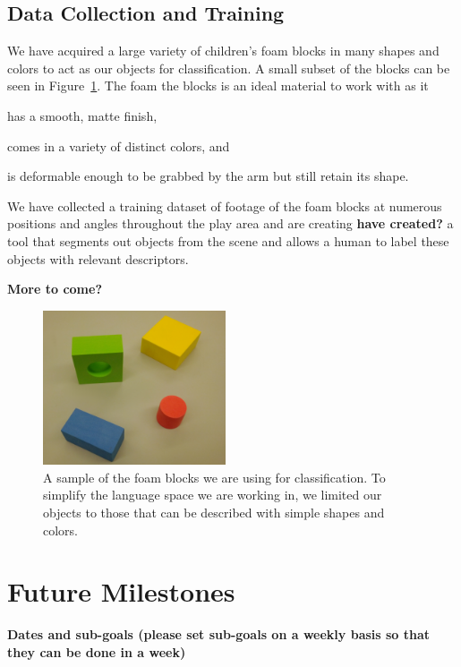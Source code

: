\documentclass[11pt]{article}
\newcommand{\xxx}[1]{{\bf \color{red} #1}}
\begin{document}
\subsection{Data Collection and Training}
We have acquired a large variety of children's foam blocks in many shapes and
colors to act as our objects for classification. A small subset of the blocks
can be seen in Figure~\ref{fig:blocks}. The foam the blocks is an ideal
material to work with as it
\begin{inparaenum}[(1)]
\item has a smooth, matte finish,
\item comes in a variety of distinct colors, and
\item is deformable enough to be grabbed by the arm but still retain its
shape.
\end{inparaenum}

We have collected a training dataset of footage of the foam blocks at numerous
positions and angles throughout the play area and are creating \xxx{have
created?} a tool that segments out objects from the scene and allows a human
to label these objects with relevant descriptors.

\xxx{More to come?}

\begin{figure}
\centering
\includegraphics[width=0.48\textwidth]{figures/blocks.png}
\caption{A sample of the foam blocks we are using for classification. To
    simplify the language space we are working in, we limited our objects to
    those that can be described with simple shapes and colors.}
\label{fig:blocks}
\end{figure}

\section{Future Milestones}
\xxx{Dates and sub-goals (please set sub-goals on a weekly basis so that they
    can be done in a week)}
\end{document}
